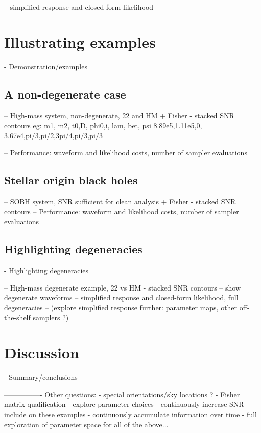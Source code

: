 \documentclass[aps,showpacs,twocolumn,prd,superscriptaddress,nofootinbib]{revtex4}
\begin{document}
-- simplified response and closed-form likelihood


\section{Illustrating examples}
\label{sec:examples}

- Demonstration/examples

\subsection{A non-degenerate case}
\label{sec:high-M-non-deg}

-- High-mass system, non-degenerate, 22 and HM + Fisher - stacked SNR contours
eg:
m1,    m2,    t0,D,     phi0,i,   lam,  bet, psi
8.89e5,1.11e5,0, 3.67e4,pi/3,pi/2,3pi/4,pi/3,pi/3

-- Performance: waveform and likelihood costs, number of sampler evaluations

\subsection{Stellar origin black holes}
\label{sec:SOBH}

-- SOBH system, SNR sufficient for clean analysis + Fisher - stacked SNR contours
-- Performance: waveform and likelihood costs, number of sampler evaluations

\subsection{Highlighting degeneracies}
\label{sec:degen}

- Highlighting degeneracies

-- High-mass degenerate example, 22 vs HM - stacked SNR contours
-- show degenerate waveforms
-- simplified response and closed-form likelihood, full degeneracies
-- (explore simplified response further: parameter maps, other off-the-shelf samplers ?)


\section{Discussion}
\label{sec:discussion}

- Summary/conclusions


----------------
Other questions:
- special orientations/sky locations ?
- Fisher matrix qualification - explore parameter choices
- continuously increase SNR - include on these examples
- continuously accumulate information over time
- full exploration of parameter space for all of the above...


\end{document}

